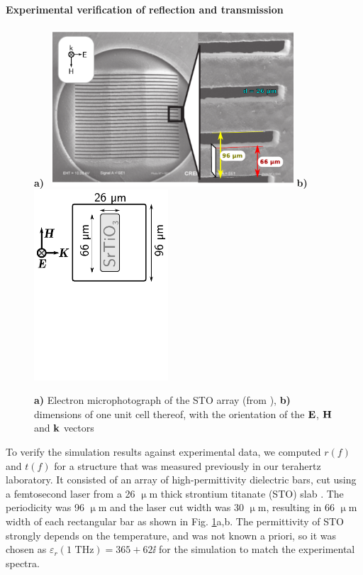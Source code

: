 \paragraph{Experimental verification of reflection and transmission} %
\begin{figure} 
\caption{\textbf{a)} Electron microphotograph of the STO array (from \cite{nemec2009tunable}), 
\textbf{b)} dimensions of one unit cell thereof, with the orientation of the $\mathbf{E}$, $\mathbf{H}$ and ${\mathbf{k}}$ vectors}  \centering 
\textbf{a)} \mbox{\vspace{3cm} \includegraphics[width=9cm]{img/STOBar_photo.pdf}}  %
\mbox{\textbf{b)} \mbox{\vspace{3cm}\includegraphics[width=5cm]{img/EBars_STO_sketch.pdf}} }
\label{fg_STO_bar_geom} \end{figure} 
To verify the simulation results against experimental data, we computed $r(f)$ and $t(f)$ for a structure that was measured previously in our terahertz laboratory.
It consisted of an array of high-permittivity dielectric bars, cut using a femtosecond laser 
from a 26 $\upmu$m thick strontium titanate (STO) slab \cite{nemec2009tunable}. The periodicity was 96 $\upmu$m and the laser cut width was 30 $\upmu$m, resulting in 66 $\upmu$m width of each rectangular bar as shown in Fig. \ref{fg_STO_bar_geom}a,b. The permittivity of STO strongly depends on the temperature, and was not known a priori, so it was chosen as $\varepsilon_r(1\text{ THz}) = 365 + 62\ii$ for the simulation to match the experimental spectra.
